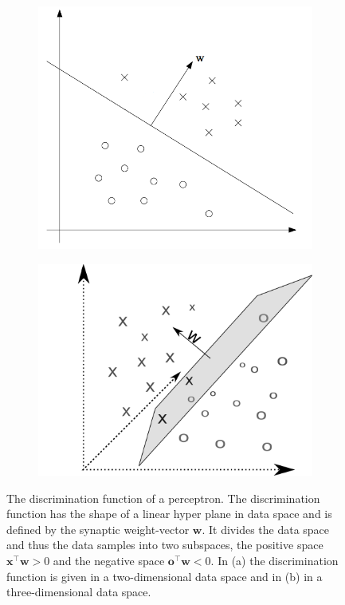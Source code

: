 \begin{figure}
	\centering
	\begin{subfigure}[t]{.45\textwidth}
	 	\centering
  		\includegraphics[width=.9\linewidth]{imgs/percept_discr1.png}
  		\caption{}
	\end{subfigure}
	\begin{subfigure}[t]{.45\textwidth}
	 	\centering
  		\includegraphics[width=.92\linewidth]{imgs/percept_discr2.png}
  		 \caption{}
	\end{subfigure}
    \caption[The discrimination function of a perceptron.]{The discrimination function of a perceptron. The discrimination function has the shape of a linear hyper plane in data space and is defined by the synaptic weight-vector $\textbf{w}$. It divides the data space and thus the data samples into two subspaces, the positive space $\textbf{x}^{\intercal}\textbf{w} > 0$ and the negative space $\textbf{o}^{\intercal}\textbf{w} < 0$. In (a) the discrimination function is given in a two-dimensional data space and in (b) in a three-dimensional data space.}
	\label{fig:discrimation}
\end{figure}


